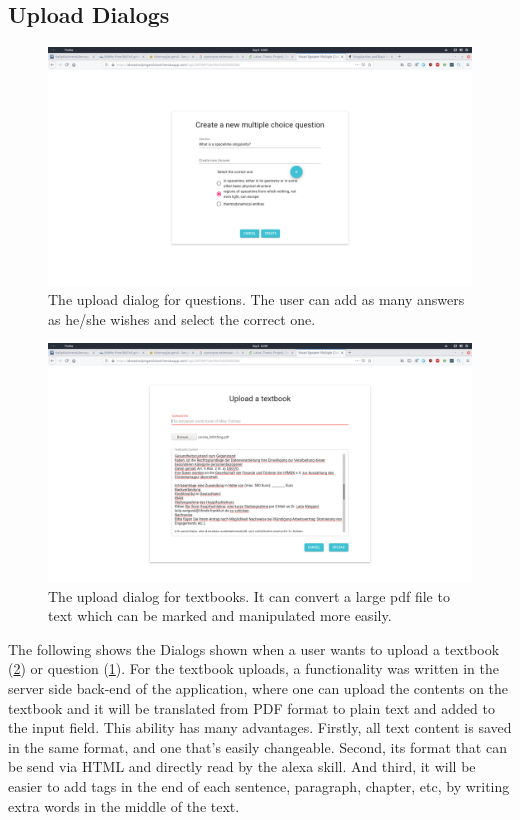 \subsection{Upload Dialogs}

\begin{figure}
  \centering
  \includegraphics[width=.9\linewidth]{images/app/asa/question_creation.png}
  \caption{
    The upload dialog for questions. The user can add as many answers as he/she wishes and
    select the correct one.
  }
  \label{fig:questions}
\end{figure}

\begin{figure}
  \centering
  \includegraphics[width=.9\linewidth]{images/app/asa/textbook_upload.png}
  \caption{
    The upload dialog for textbooks. It can convert a large pdf file to text which can be
    marked and manipulated more easily.
  }
  \label{fig:textbooks}
\end{figure}

The following shows the Dialogs shown when a user wants to upload a textbook (\ref{fig:textbooks}) or question (\ref{fig:questions}).
For the textbook uploads, a functionality was written in the server side back-end of
the application, where one can upload the contents on the textbook and it will be 
translated from PDF format to plain text and added to the input field. This ability
has many advantages. Firstly, all text content is saved in the same format, and one
that's easily changeable. Second, its format that can be send via HTML and directly
read by the alexa skill. And third, it will be easier to add tags in the end of each 
sentence, paragraph, chapter, etc, by writing extra words in the middle of the text.

